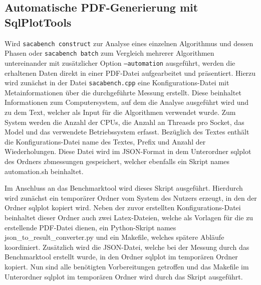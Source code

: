 \subsection{Automatische PDF-Generierung mit SqlPlotTools}
\label{framework:bechmark:sqlplottools}

Wird \texttt{sacabench construct} zur Analyse eines einzelnen Algorithmus und dessen Phasen oder \texttt{sacabench batch} zum Vergleich mehrerer Algorithmen untereinander mit zusätzlicher Option \texttt{--automation} ausgeführt, werden die erhaltenen Daten direkt in einer PDF-Datei aufgearbeitet und präsentiert.
Hierzu wird zunächst in der Datei \texttt{sacabench.cpp} eine Konfigurations-Datei mit Metainformationen über die durchgeführte Messung erstellt.
Diese beinhaltet Informationen zum Computersystem, auf dem die Analyse ausgeführt wird und zu dem Text, welcher als Input für die Algorithmen verwendet wurde.
Zum System werden die Anzahl der CPUs, die Anzahl an Threasds pro Socket, das Model und das verwendete Betriebssystem erfasst.
Bezüglich des Textes enthält die Konfigurations-Datei name des Textes, Prefix und Anzahl der Wiederholungen.
Diese Datei wird im JSON-Format in dem Unterordner sqlplot des Ordners zbmessungen gespeichert, welcher ebenfalls ein Skript names automation.sh beinhaltet.

Im Anschluss an das Benchmarktool wird dieses Skript ausgeführt.
Hierdurch wird zunächst ein temporärer Ordner vom System des Nutzers erzeugt, in den der Ordner sqlplot kopiert wird.
Neben der zuvor erstellten Konfigurations-Datei beinhaltet dieser Ordner auch zwei Latex-Dateien, welche als Vorlagen für die zu erstellende PDF-Datei dienen, ein Python-Skript names json\_to\_result\_converter.py und ein Makefile, welches spätere Abläufe koordiniert.
Zusätzlich wird die JSON-Datei, welche bei der Messung durch das Benchmarktool erstellt wurde, in den Ordner sqlplot im temporären Ordner kopiert.
Nun sind alle benötigten Vorbereitungen getroffen und das Makefile im Unterordner sqlplot im temporären Ordner wird durch das Skript ausgeführt.

